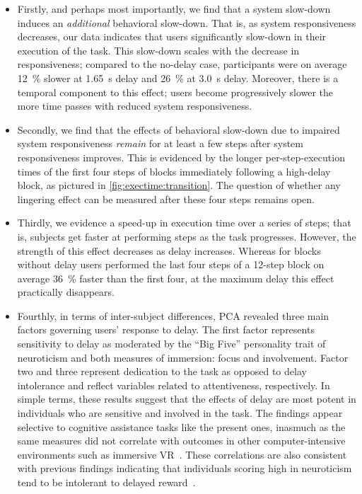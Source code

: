 \begin{itemize}
  \item Firstly, and perhaps most importantly, we find that a system slow-down induces an \textit{additional} behavioral slow-down.
  That is, as system responsiveness decreases, our data indicates that users significantly slow-down in their execution of the task.
  This slow-down scales with the decrease in responsiveness; compared to the no-delay case, participants were on average \SI{12}{\percent} slower at \SI{1.65}{\second} delay and \SI{26}{\percent} at \SI{3.0}{\second} delay.
  Moreover, there is a temporal component to this effect; users become progressively slower the more time passes with reduced system responsiveness.

  \item Secondly, we find that the effects of behavioral slow-down due to impaired system responsiveness \emph{remain} for at least a few steps after system responsiveness improves.
  This is evidenced by the longer per-step-execution times of the first four steps of blocks immediately following a high-delay block, as pictured in \cref{fig:exectime:transition}.
  The question of whether any lingering effect can be measured after these four steps remains open.

  \item Thirdly, we evidence a speed-up in execution time over a series of steps; that is, subjects get faster at performing steps as the task progresses.
  However, the strength of this effect decreases as delay increases.
  Whereas for blocks without delay users performed the last four steps of a 12-step block on average \SI{36}{\percent} faster than the first four, at the maximum delay this effect practically disappears.

  \item Fourthly, in terms of inter-subject differences, PCA revealed three main factors governing users' response to delay. 
  The first factor represents sensitivity to delay as moderated by the ``Big Five'' personality trait of neuroticism and both measures of immersion: focus and involvement.
  Factor two and three represent dedication to the task as opposed to delay intolerance and reflect variables related to attentiveness, respectively.
  In simple terms, these results suggest that the effects of delay are most potent in individuals who are sensitive and involved in the task.
  The findings appear selective to cognitive assistance tasks like the present ones, inasmuch as the same measures did not correlate with outcomes in other computer-intensive environments such as immersive VR~\cite{quesnel2018you}.
  These correlations are also consistent with previous findings indicating that individuals scoring high in neuroticism tend to be intolerant to delayed reward~\cite{hirsh2008delay}.
\end{itemize}

